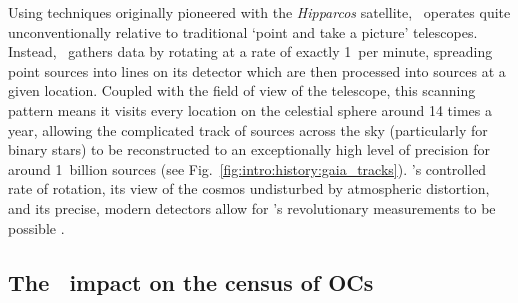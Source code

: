 Using techniques originally pioneered with the \emph{Hipparcos} satellite, \gaia\ operates quite unconventionally relative to traditional `point and take a picture' telescopes. Instead, \gaia\ gathers data by rotating at a rate of exactly 1\textdegree\ per minute, spreading point sources into lines on its detector which are then processed into sources at a given location. Coupled with the field of view of the telescope, this scanning pattern means it visits every location on the celestial sphere around 14 times a year, allowing the complicated track of sources across the sky (particularly for binary stars) to be reconstructed to an exceptionally high level of precision for around 1~billion sources (see Fig.~\ref{fig:intro:history:gaia_tracks}). \gaia's controlled rate of rotation, its view of the cosmos undisturbed by atmospheric distortion, and its precise, modern detectors allow for \gaia's revolutionary measurements to be possible \citep{gaia_collaboration_gaia_2016}.


\subsection{The \gaia\ impact on the census of OCs}
\label{sec:intro:gaia:census}

